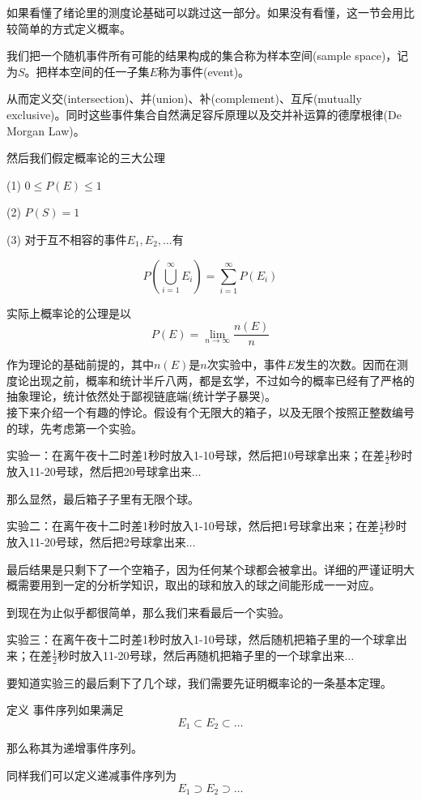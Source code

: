 \documentclass[UTF8]{ctexart}
\begin{document}
如果看懂了绪论里的测度论基础可以跳过这一部分。如果没有看懂，这一节会用比较简单的方式定义概率。

我们把一个随机事件所有可能的结果构成的集合称为样本空间(sample space)，记为$S$。把样本空间的任一子集$E$称为事件(event)。

从而定义交(intersection)、并(union)、补(complement)、互斥(mutually exclusive)。同时这些事件集合自然满足容斥原理以及交并补运算的德摩根律(De Morgan Law)。

然后我们假定概率论的三大公理

(1) $0\leq P(E) \leq 1$

(2) $P(S) = 1$

(3) 对于互不相容的事件$E_{1},E_{2},\ldots $有

$$P(\bigcup_{i=1}^{\infty} E_{i})=\sum_{i=1}^{\infty} P(E_{i}) $$

实际上概率论的公理是以
$$P(E)=\mathop{lim}\limits_{n\to \infty }\frac{n(E)}{n}$$

作为理论的基础前提的，其中$n(E)$是$n$次实验中，事件$E$发生的次数。因而在测度论出现之前，概率和统计半斤八两，都是玄学，不过如今的概率已经有了严格的抽象理论，统计依然处于鄙视链底端(统计学子暴哭)。\\

接下来介绍一个有趣的悖论。假设有个无限大的箱子，以及无限个按照正整数编号的球，先考虑第一个实验。

实验一：在离午夜十二时差1秒时放入1-10号球，然后把10号球拿出来；在差$\frac{1}{2}$秒时放入11-20号球，然后把20号球拿出来$\ldots $

那么显然，最后箱子子里有无限个球。

实验二：在离午夜十二时差1秒时放入1-10号球，然后把1号球拿出来；在差$\frac{1}{2}$秒时放入11-20号球，然后把2号球拿出来$\ldots $

最后结果是只剩下了一个空箱子，因为任何某个球都会被拿出。详细的严谨证明大概需要用到一定的分析学知识，取出的球和放入的球之间能形成一一对应。

到现在为止似乎都很简单，那么我们来看最后一个实验。

实验三：在离午夜十二时差1秒时放入1-10号球，然后随机把箱子里的一个球拿出来；在差$\frac{1}{2}$秒时放入11-20号球，然后再随机把箱子里的一个球拿出来$\ldots $

要知道实验三的最后剩下了几个球，我们需要先证明概率论的一条基本定理。

定义 事件序列如果满足
$$E_{1}\subset E_{2} \subset \ldots $$

那么称其为递增事件序列。

同样我们可以定义递减事件序列为
$$E_{1}\supset E_{2} \supset \ldots $$
\end{document}
